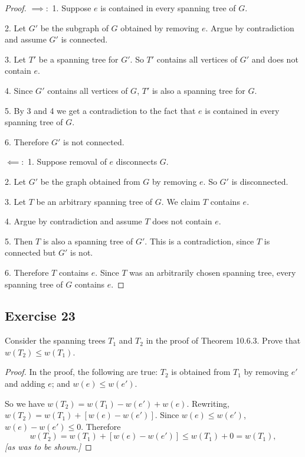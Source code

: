 \documentclass[14pt]{extarticle}
\begin{document}
\begin{proof}
    \(\bm{\implies:}\) 1. Suppose \(e\) is contained in every spanning tree of \(G\).

    2. Let \(G'\) be the subgraph of \(G\) obtained by removing \(e\). Argue by contradiction and assume \(G'\) is connected.

    3. Let \(T'\) be a spanning tree for \(G'\). So \(T'\) contains all vertices of \(G'\) and does not contain \(e\).

    4. Since \(G'\) contains all vertices of \(G\), \(T'\) is also a spanning tree for \(G\).

    5. By 3 and 4 we get a contradiction to the fact that \(e\) is contained in every spanning tree of \(G\).

    6. Therefore \(G'\) is not connected.

    \(\bm{\impliedby:}\) 1. Suppose removal of \(e\) disconnects \(G\).

    2. Let \(G'\) be the graph obtained from \(G\) by removing \(e\). So \(G'\) is disconnected.

    3. Let \(T\) be an arbitrary spanning tree of \(G\). We claim \(T\) contains \(e\).

    4. Argue by contradiction and assume \(T\) does not contain \(e\).

    5. Then \(T\) is also a spanning tree of \(G'\). This is a contradiction, since \(T\) is connected but \(G'\) is not.

    6. Therefore \(T\) contains \(e\). Since \(T\) was an arbitrarily chosen spanning tree, every spanning tree of \(G\)
    contains \(e\).
\end{proof}

\subsection{Exercise 23}
Consider the spanning trees \(T_1\) and \(T_2\) in the proof of Theorem 10.6.3. Prove that \(w(T_2) \leq w(T_1)\).

\begin{proof}
    In the proof, the following are true: \(T_2\) is obtained from \(T_1\) by removing \(e'\) and adding \(e\); and
    \(w(e) \leq w(e')\).

    So we have \(w(T_2) = w(T_1) - w(e') + w(e)\). Rewriting, \(w(T_2) = w(T_1) + [w(e)- w(e')]\). Since \(w(e) \leq w(e')\),
    \(w(e) - w(e') \leq 0\). Therefore
    \[
        w(T_2) = w(T_1) + [w(e) - w(e')] \leq w(T_1) + 0 = w(T_1),
    \]
    {\it [as was to be shown.]}
\end{proof}
\end{document}
